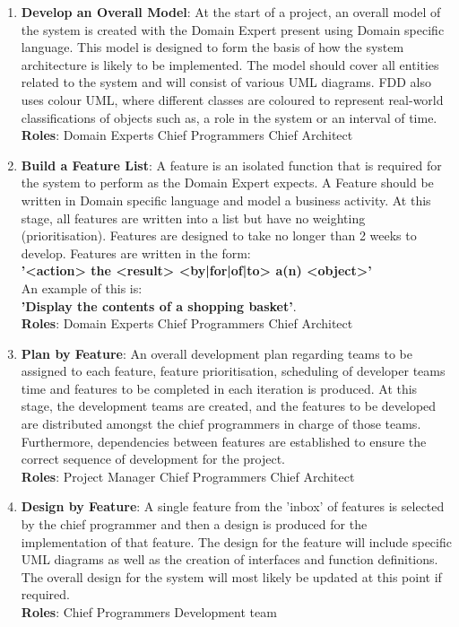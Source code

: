 \documentclass{article}
\begin{document}
\begin{enumerate}
	\item \textbf{Develop an Overall Model}: At the start of a project, an overall model of the system is created with the Domain Expert present using Domain specific language. This model is designed to form the basis of how the system architecture is likely to be implemented. The model should cover all entities related to the system and will consist of various UML diagrams. FDD also uses colour UML, where different classes are coloured to represent real-world classifications of objects such as, a role in the system or an interval of time.
	\\
	\textbf{Roles}: Domain Experts \textbullet{} Chief Programmers \textbullet{} Chief Architect
	
	\item \textbf{Build a Feature List}: A feature is an isolated function that is required for the system to perform as the Domain Expert expects. A Feature should be written in Domain specific language and model a business activity. At this stage, all features are written into a list but have no weighting (prioritisation). Features are designed to take no longer than 2 weeks to develop. Features are written in the form: \\ 
\textbf{'<action> the <result> <by|for|of|to> a(n) <object>'}
\\An example of this is: \\
\textbf{'Display the contents of a shopping basket'}.
	\\
	\textbf{Roles}: Domain Experts \textbullet{} Chief Programmers \textbullet{} Chief Architect
	
	\item \textbf{Plan by Feature}: An overall development plan regarding teams to be assigned to each feature, feature prioritisation, scheduling of developer teams time and features to be completed in each iteration is produced. At this stage, the development teams are created, and the features to be developed are distributed amongst the chief programmers in charge of those teams. Furthermore, dependencies between features are established to ensure the correct sequence of development for the project.
	\\
	\textbf{Roles}: Project Manager \textbullet{} Chief Programmers \textbullet{} Chief Architect
	
\newpage %

	\item \textbf{Design by Feature}: A single feature from the 'inbox' of features is selected by the chief programmer and then a design is produced for the implementation of that feature. The design for the feature will include specific UML diagrams as well as the creation of interfaces and function definitions. The overall design for the system will most likely be updated at this point if required.
	\\
	\textbf{Roles}: Chief Programmers \textbullet{} Development team
	

\end{enumerate}
\end{document}
